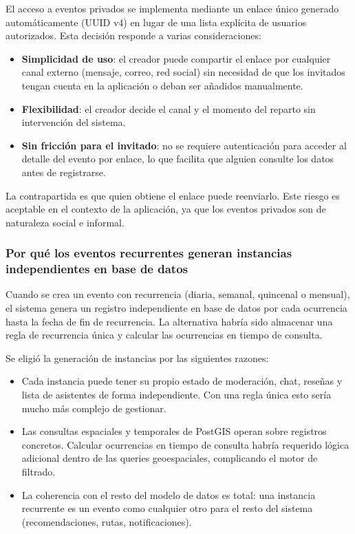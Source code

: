 El acceso a eventos privados se implementa mediante un enlace único generado automáticamente (UUID v4) en lugar de una lista explícita de usuarios autorizados. Esta decisión responde a varias consideraciones:

\begin{itemize}
    \item \textbf{Simplicidad de uso}: el creador puede compartir el enlace por cualquier canal externo (mensaje, correo, red social) sin necesidad de que los invitados tengan cuenta en la aplicación o deban ser añadidos manualmente.
    \item \textbf{Flexibilidad}: el creador decide el canal y el momento del reparto sin intervención del sistema.
    \item \textbf{Sin fricción para el invitado}: no se requiere autenticación para acceder al detalle del evento por enlace, lo que facilita que alguien consulte los datos antes de registrarse.
\end{itemize}

La contrapartida es que quien obtiene el enlace puede reenviarlo. Este riesgo es aceptable en el contexto de la aplicación, ya que los eventos privados son de naturaleza social e informal.

\subsubsection{Por qué los eventos recurrentes generan instancias independientes en base de datos}

Cuando se crea un evento con recurrencia (diaria, semanal, quincenal o mensual), el sistema genera un registro independiente en base de datos por cada ocurrencia hasta la fecha de fin de recurrencia. La alternativa habría sido almacenar una regla de recurrencia única y calcular las ocurrencias en tiempo de consulta.

Se eligió la generación de instancias por las siguientes razones:

\begin{itemize}
    \item Cada instancia puede tener su propio estado de moderación, chat, reseñas y lista de asistentes de forma independiente. Con una regla única esto sería mucho más complejo de gestionar.
    \item Las consultas espaciales y temporales de PostGIS operan sobre registros concretos. Calcular ocurrencias en tiempo de consulta habría requerido lógica adicional dentro de las queries geoespaciales, complicando el motor de filtrado.
    \item La coherencia con el resto del modelo de datos es total: una instancia recurrente es un evento como cualquier otro para el resto del sistema (recomendaciones, rutas, notificaciones).
\end{itemize}

